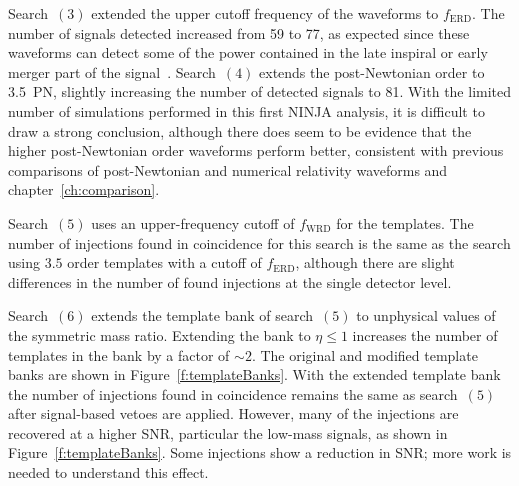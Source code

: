Search~$(3)$ extended the upper cutoff frequency of the waveforms to
$f_\mathrm{ERD}$. The number of signals detected increased from 59 to
77, as expected since these waveforms can detect some of the power
contained in the late inspiral or early merger part of the
signal~\cite{Pan:2007nw,Boyle:2009dg}. Search~$(4)$ extends the
post-Newtonian order to 3.5~PN, slightly increasing the number of
detected signals to 81.  With the limited number of simulations
performed in this first NINJA analysis, it is difficult to draw a
strong conclusion, although there does seem to be evidence that the
higher post-Newtonian order waveforms perform better, consistent with
previous comparisons of post-Newtonian and numerical relativity
waveforms
\cite{Pan:2007nw,Baker:2006ha,Hannam:2007ik,Boyle:2008ge,Boyle:2009dg}
and chapter~\ref{ch:comparison}.

Search~$(5)$ uses an upper-frequency cutoff of $f_\mathrm{WRD}$ for
the templates. The number of injections found in coincidence for this
search is the same as the search using $3.5$ order templates with a
cutoff of $f_\mathrm{ERD}$, although there are slight differences in
the number of found injections at the single detector level.

Search~$(6)$ extends the template bank of search~$(5)$ to unphysical
values of the symmetric mass ratio. Extending the bank to $\eta\le 1$
increases the number of templates in the bank by a factor of $\sim 2$.
The original and modified template banks are shown in
Figure~\ref{f:templateBanks}. With the extended template bank the
number of injections found in coincidence remains the same as
search~$(5)$ after signal-based vetoes are applied.  However, many of
the injections are recovered at a higher SNR, particular the low-mass
signals, as shown in Figure~\ref{f:templateBanks}.  Some injections
show a reduction in SNR; more work is needed to understand this
effect.

